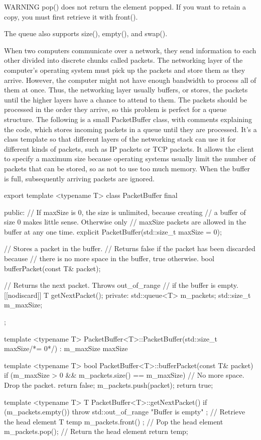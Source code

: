 \begin{myWarning}{WARNING}
pop() does not return the element popped. If you want to retain a copy, you must first retrieve it with front().
\end{myWarning}

The queue also supports size(), empty(), and swap().


When two computers communicate over a network, they send information to each other divided into discrete chunks called packets. The networking layer of the computer’s operating system must pick up the packets and store them as they arrive. However, the computer might not have enough bandwidth to process all of them at once. Thus, the networking layer usually buffers, or stores, the packets until the higher layers have a chance to attend to them. The packets should be processed in the order they arrive, so this problem is perfect for a queue structure. The following is a small PacketBuffer class, with comments explaining the code, which stores incoming packets in a queue until they are processed. It’s a class template so that different layers of the networking stack can use it for different kinds of packets, such as IP packets or TCP packets. It allows the client to specify a maximum size because operating systems usually limit the number of packets that can be stored, so as not to use too much memory. When the buffer is full, subsequently arriving packets are ignored.

\begin{cpp}
export template <typename T>
class PacketBuffer final
{
    public:
        // If maxSize is 0, the size is unlimited, because creating
        // a buffer of size 0 makes little sense. Otherwise only
        // maxSize packets are allowed in the buffer at any one time.
        explicit PacketBuffer(std::size_t maxSize = 0);

        // Stores a packet in the buffer.
        // Returns false if the packet has been discarded because
        // there is no more space in the buffer, true otherwise.
        bool bufferPacket(const T& packet);

        // Returns the next packet. Throws out_of_range
        // if the buffer is empty.
        [[nodiscard]] T getNextPacket();
    private:
        std::queue<T> m_packets;
        std::size_t m_maxSize;
};

template <typename T> PacketBuffer<T>::PacketBuffer(std::size_t maxSize/*= 0*/)
    : m_maxSize { maxSize }
{}

template <typename T> bool PacketBuffer<T>::bufferPacket(const T& packet)
{
    if (m_maxSize > 0 && m_packets.size() == m_maxSize) {
        // No more space. Drop the packet.
        return false;
    }
    m_packets.push(packet);
    return true;
}

template <typename T> T PacketBuffer<T>::getNextPacket()
{
    if (m_packets.empty()) {
        throw std::out_of_range { "Buffer is empty" };
    }
    // Retrieve the head element
    T temp { m_packets.front() };
    // Pop the head element
    m_packets.pop();
    // Return the head element
    return temp;
}
\end{cpp}

